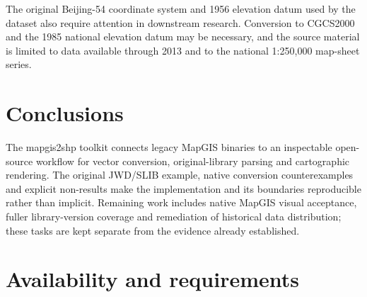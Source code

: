 \documentclass[preprint,12pt,numbers]{elsarticle}
\begin{document}
The original Beijing-54 coordinate system and 1956 elevation datum used by the dataset also require attention in downstream research. Conversion to CGCS2000 and the 1985 national elevation datum may be necessary, and the source material is limited to data available through 2013 and to the national 1:250{,}000 map-sheet series.

\section{Conclusions}

The mapgis2shp toolkit connects legacy MapGIS binaries to an inspectable open-source workflow for vector conversion, original-library parsing and cartographic rendering. The original JWD/SLIB example, native conversion counterexamples and explicit non-results make the implementation and its boundaries reproducible rather than implicit. Remaining work includes native MapGIS visual acceptance, fuller library-version coverage and remediation of historical data distribution; these tasks are kept separate from the evidence already established.

\section{Availability and requirements}
\end{document}
